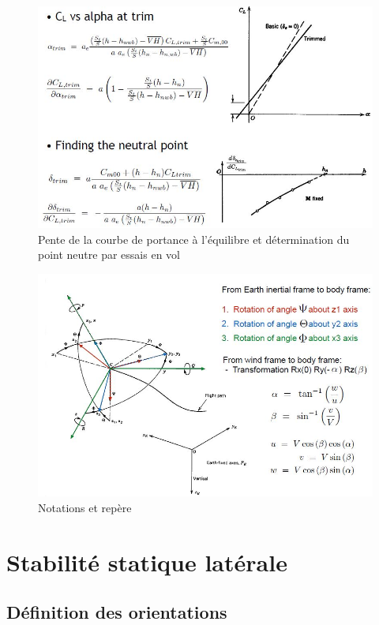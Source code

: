 \documentclass{report}
\begin{document}
\begin{figure}[h!]
    \centering
    \includegraphics[scale=0.8]{27.JPG}
    \caption{Pente de la courbe de portance à l'équilibre et détermination du point neutre par essais en vol}
    \label{27}
\end{figure}
\begin{figure}[h!]
    \centering
    \includegraphics[scale=0.7]{28.JPG}
    \caption{Notations et repère}
    \label{28}
\end{figure}
\newpage

\section{Stabilité statique latérale}

\subsection{Définition des orientations}
\end{document}
